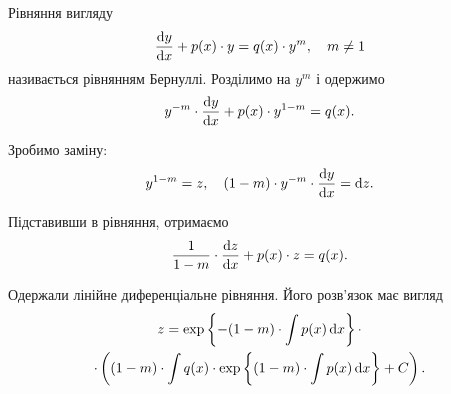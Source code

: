 Рівняння вигляду
\begin{equation*}
	\frac{\mathop{}\!\mathrm{d} y}{\mathop{}\!\mathrm{d} x} + p(x) \cdot y = q(x) \cdot y^m, \quad m \ne 1
\end{equation*}
називається рівнянням Бернуллі. Розділимо на $y^m$ і одержимо 
\begin{equation*}
	y^{-m} \cdot \frac{\mathop{}\!\mathrm{d} y}{\mathop{}\!\mathrm{d} x} + p(x) \cdot y^{1-m} = q(x).
\end{equation*}

Зробимо заміну: 
\begin{equation*}
	y^{1-m} = z, \quad (1 - m) \cdot y^{-m} \cdot \frac{\mathop{}\!\mathrm{d} y}{\mathop{}\!\mathrm{d} x} = \mathop{}\!\mathrm{d} z.
\end{equation*}

Підставивши в рівняння, отримаємо
\begin{equation*}
	\frac{1}{1-m} \cdot \frac{\mathop{}\!\mathrm{d} z}{\mathop{}\!\mathrm{d} x} + p(x) \cdot z = q(x).
\end{equation*}

Одержали лінійне диференціальне рівняння. Його розв’язок має вигляд
\begin{multline*}
	z = \exp\left\{ -(1 - m) \cdot \int p(x) \mathop{}\!\mathrm{d} x \right\} \cdot \\
	\cdot \left( (1-m) \cdot \int q(x) \cdot \exp\left\{ (1 - m) \cdot \int p(x) \mathop{}\!\mathrm{d} x \right\} + C\right).
\end{multline*}
